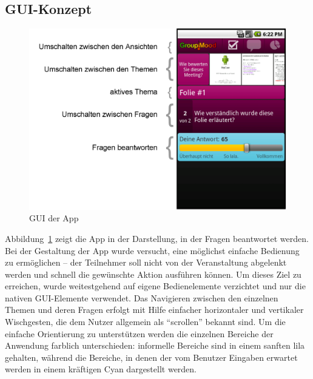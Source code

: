 \subsection{GUI-Konzept}

\begin{figure}[htb]
\begin{center}
\includegraphics[width=\textwidth]{media/app.png}
\end{center}
\caption{GUI der App}
\label{f:gui}
\end{figure}

Abbildung~\ref{f:gui} zeigt die App in der Darstellung, in der Fragen beantwortet werden. Bei der Gestaltung der App wurde versucht, eine möglichst einfache Bedienung zu ermöglichen -- der Teilnehmer soll nicht von der Veranstaltung abgelenkt werden und schnell die gewünschte Aktion ausführen können. Um dieses Ziel zu erreichen, wurde weitestgehend auf eigene Bedienelemente verzichtet und nur die nativen GUI-Elemente verwendet. Das Navigieren zwischen den einzelnen Themen und deren Fragen erfolgt mit Hilfe einfacher horizontaler und vertikaler Wischgesten, die dem Nutzer allgemein als "`scrollen"' bekannt sind. Um die einfache Orientierung zu unterstützen werden die einzelnen Bereiche der Anwendung farblich unterschieden: informelle Bereiche sind in einem sanften lila gehalten, während die Bereiche, in denen der vom Benutzer Eingaben erwartet werden in einem kräftigen Cyan dargestellt werden.